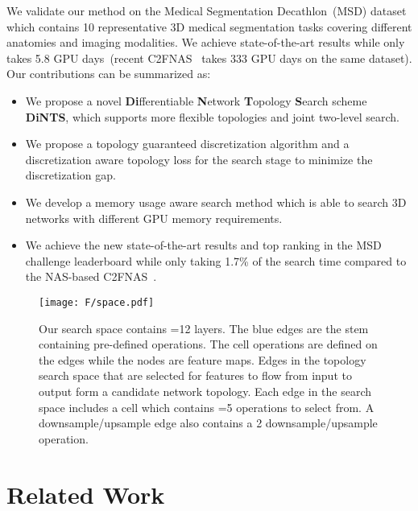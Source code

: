 \documentclass[final]{cvpr}
\begin{document}
We validate our method on the Medical Segmentation Decathlon~(MSD) dataset~\cite{simpson2019large}  which contains 10 representative 3D medical segmentation tasks covering different anatomies and imaging modalities. We achieve state-of-the-art results while only takes 5.8 GPU days~(recent C2FNAS~\cite{yu2020c2fnas} takes 333 GPU days on the same dataset). Our contributions can be summarized as: 
\begin{itemize}
  \item We propose a novel \textbf{Di}fferentiable \textbf{N}etwork \textbf{T}opology \textbf{S}earch scheme \textbf{DiNTS}, which supports more flexible topologies and joint two-level search.
  \item We propose a topology guaranteed discretization algorithm and a discretization aware topology loss for the search stage to minimize the discretization gap.
  \item We develop a memory usage aware search method which is able to search 3D networks with different GPU memory requirements.
  \item We achieve the new state-of-the-art results and top ranking in the MSD challenge leaderboard while only taking 1.7\% of the search time compared to the NAS-based C2FNAS~\cite{yu2020c2fnas}.
\end{itemize}




\begin{figure*}[t]
\begin{center}
\texttt{[image: F/space.pdf]}
\end{center}
  \caption{Our search space contains =12 layers. The blue edges are the stem containing pre-defined operations. The cell operations are defined on the edges while the nodes are feature maps. Edges in the topology search space that are selected for features to flow from input to output form a candidate network topology. Each edge in the search space includes a cell which contains =5 operations to select from. A downsample/upsample edge also contains a 2 downsample/upsample operation.}
\label{fig:ss}
\end{figure*}
\section{Related Work}
\end{document}
